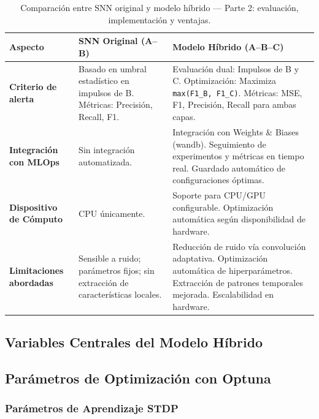 \begin{table}[!htbp]
\centering
\small
\renewcommand{\arraystretch}{1.3}
\begin{tabularx}{0.99\textwidth}{>{\hsize=0.5\hsize\raggedright\arraybackslash}X
                                 >{\hsize=1.2\hsize\raggedright\arraybackslash}X
                                 >{\hsize=1.3\hsize\raggedright\arraybackslash}X}
\hline\hline
\textbf{Aspecto} & \textbf{SNN Original (A--B)} & \textbf{Modelo Híbrido (A--B--C)} \\
\hline
\textbf{Criterio de alerta} & 
Basado en umbral estadístico en impulsos de B.  
Métricas: Precisión, Recall, F1. & 
Evaluación dual: Impulsos de B y C.  
Optimización: Maximiza \texttt{max(F1\_B, F1\_C)}.  
Métricas: MSE, F1, Precisión, Recall para ambas capas. \\
\hline
\textbf{Integración con MLOps} & 
Sin integración automatizada. & 
Integración con Weights \& Biases (wandb).  
Seguimiento de experimentos y métricas en tiempo real.  
Guardado automático de configuraciones óptimas. \\
\hline
\textbf{Dispositivo de Cómputo} & 
CPU únicamente. & 
Soporte para CPU/GPU configurable.  
Optimización automática según disponibilidad de hardware. \\
\hline
\textbf{Limitaciones abordadas} & 
Sensible a ruido; parámetros fijos; sin extracción de características locales. & 
Reducción de ruido vía convolución adaptativa.  
Optimización automática de hiperparámetros.  
Extracción de patrones temporales mejorada.  
Escalabilidad en hardware. \\
\hline\hline
\end{tabularx}
\caption{Comparación entre SNN original y modelo híbrido — Parte 2: evaluación, implementación y ventajas.}
\label{tab:comparacion-arquitecturas-2}
\end{table}


\subsection{Variables Centrales del Modelo Híbrido}

\subsection{Parámetros de Optimización con Optuna}

\subsubsection*{Parámetros de Aprendizaje STDP}

